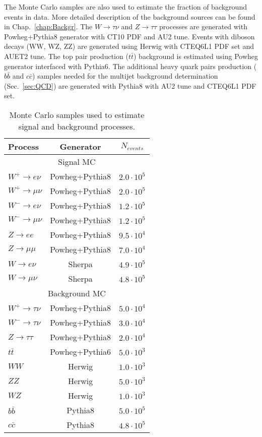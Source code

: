 The Monte Carlo samples are also used to estimate the fraction of background events in data. More detailed description of the background sources can be found in Chap.~\ref{chap:Backgr}. The $W\to \tau\nu$ and $Z \to \tau\tau$ processes are generated with Powheg+Pythia8 generator with CT10 PDF and AU2 tune. Events with diboson decays (WW, WZ, ZZ) are generated using Herwig with CTEQ6L1\cite{Pumplin2002} PDF set and AUET2\cite{ATL-PHYS-PUB-2010-014} tune. The top pair production ($t\bar{t}$) background is estimated using Powheg generator interfaced with Pythia6. The additional heavy quark pairs production ($b\bar{b}$ and $c\bar{c}$) samples needed for the multijet background determination (Sec.~\ref{sec:QCD}) are generated with Pythia8 with AU2 tune and CTEQ6L1 PDF set.

\begin{table}[!h]
\caption{Monte Carlo samples used to estimate signal and background processes.}
\label{tab:MCSamples}
\begin{center}
\begin{tabular}{l | c | c  }
Process & Generator & $N_{events}$ \\
\hline
\multicolumn{3}{c}{Signal MC}\\
\hline
$W^{+} \to e\nu$ & Powheg+Pythia8 & $2.0\cdot10^5$ \\
$W^{+} \to \mu\nu$ & Powheg+Pythia8 & $2.0\cdot10^5$ \\
$W^{-} \to e\nu$ & Powheg+Pythia8 & $1.2\cdot10^5$ \\
$W^{-} \to \mu\nu$ & Powheg+Pythia8 &  $1.2\cdot10^5$\\
$Z \to ee$ & Powheg+Pythia8 & $9.5\cdot10^4$ \\
$Z \to \mu\mu$ & Powheg+Pythia8 &  $7.0\cdot10^4$ \\
\hline
$W \to e\nu$ & Sherpa &  $4.9 \cdot 10^5$\\
$W \to \mu\nu$ & Sherpa &$4.8 \cdot 10^5$ \\
\hline 
\hline
\multicolumn{3}{c}{Background MC} \\
\hline
$W^{+} \to \tau\nu$ & Powheg+Pythia8 & $5.0\cdot10^4$ \\
$W^{-} \to \tau\nu$ & Powheg+Pythia8 & $3.0\cdot10^4$ \\
$Z \to \tau\tau$ & Powheg+Pythia8 & $2.0\cdot10^4$  \\
$t \bar{t}$ & Powheg+Pythia6 &  $5.0\cdot10^3$\\
$WW$ & Herwig &  $1.0\cdot10^3$ \\
$ZZ$ & Herwig &   $5.0\cdot10^3$ \\
$WZ$ & Herwig &  $1.0\cdot10^3$ \\
$b\bar{b}$ & Pythia8 & $5.0 \cdot 10^5$ \\
$c\bar{c}$ & Pythia8 &  $4.8 \cdot 10^5$ \\
\hline
\end{tabular}
\end{center}
\end{table}


